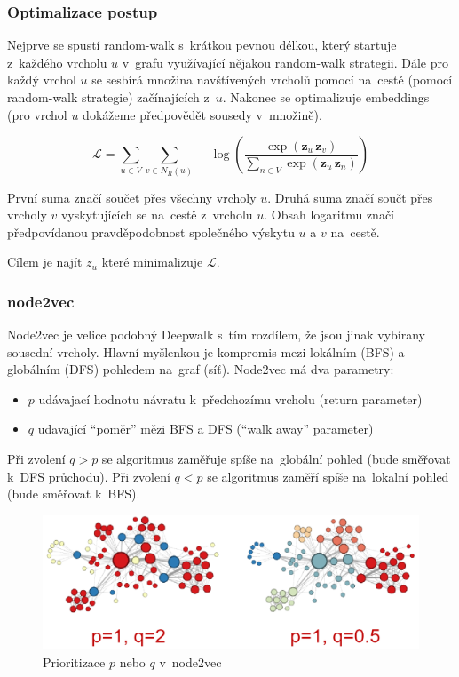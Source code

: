 \subsubsection{Optimalizace postup}

Nejprve se spustí random-walk s~krátkou pevnou délkou, který startuje z~každého vrcholu $u$ v~grafu využívající nějakou random-walk strategii.
Dále pro každý vrchol $u$ se sesbírá množina navštívených vrcholů pomocí na~cestě (pomocí random-walk strategie) začínajících z~$u$.
Nakonec se optimalizuje embeddings (pro vrchol $u$ dokážeme předpovědět sousedy v~množině).

$$\mathcal{L} = \sum_{u\in V} \sum_{v\in N_R (u)} - \log(\frac{\exp(\mathbf{z}_{u}\,\mathbf{z}_{v})}{\sum_{n\in V} \exp(\mathbf{z}_{u}\,\mathbf{z}_{n})})$$

První suma značí součet přes všechny vrcholy $u$.
Druhá suma značí součt přes vrcholy $v$ vyskytujících se na~cestě z~vrcholu $u$.
Obsah logaritmu značí předpovídanou pravděpodobnost společného výskytu $u$ a $v$ na~cestě.

Cílem je najít $z_u$ které minimalizuje $\mathcal{L}$.


\subsubsection{node2vec}

Node2vec je velice podobný Deepwalk s~tím rozdílem, že jsou jinak vybírany sousední vrcholy.
Hlavní myšlenkou je kompromis mezi lokálním (BFS) a globálním (DFS) pohledem na~graf (síť).
Node2vec má dva parametry:
\begin{itemize}
	\item $p$ udávajací hodnotu návratu k~předchozímu vrcholu (return parameter)
	\item $q$ udavající \enquote{poměr} mězi BFS a DFS (\enquote{walk away} parameter)
\end{itemize}

Při zvolení $q>p$ se algoritmus zaměřuje spíše na~globální pohled (bude směřovat k~DFS průchodu). Při zvolení $q<p$ se algoritmus zaměří spíše na~lokalní pohled (bude směřovat k~BFS).

\begin{figure}[ht]
    \centering
	\includegraphics[width=\textwidth]{images/11_node2vec-pq}
    \caption{Prioritizace $p$ nebo $q$ v~node2vec}
\end{figure}

